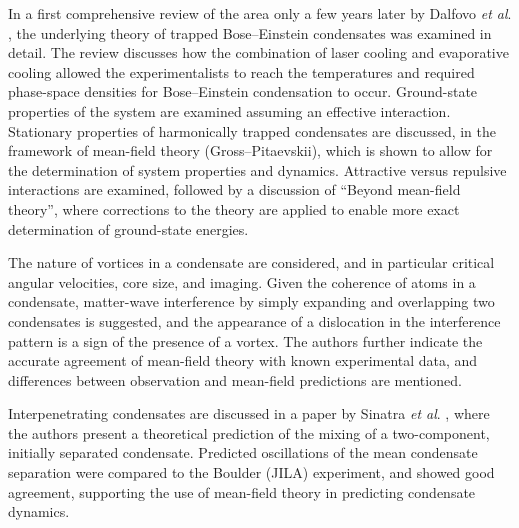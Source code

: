 In a first comprehensive review of the area only a few years later by Dalfovo \textit{et al}. \cite{BEC:Dalfovo_revmod_1999}, the underlying theory of trapped Bose--Einstein condensates was examined in detail. The review discusses how the combination of laser cooling and evaporative cooling \cite{AO:Ketterle_amop_1996} allowed the experimentalists to reach the temperatures and required phase-space densities for Bose--Einstein condensation to occur. Ground-state properties of the system are examined assuming an effective interaction. Stationary properties of harmonically trapped condensates are discussed, in the framework of mean-field theory (Gross--Pitaevskii), which is shown to allow for the determination of system properties and dynamics. Attractive versus repulsive interactions are examined, followed by a discussion of ``Beyond mean-field theory'', where corrections to the theory are applied to enable more exact determination of ground-state energies.

The nature of vortices in a condensate are considered, and in particular critical angular velocities, core size, and imaging. Given the coherence of atoms in a condensate, matter-wave interference by simply expanding and overlapping two condensates is suggested, and the appearance of a dislocation in the interference pattern is a sign of the presence of a vortex. The authors further indicate the accurate agreement of mean-field theory with known experimental data, and differences between observation and mean-field predictions are mentioned. %

Interpenetrating condensates are discussed in a paper by Sinatra \textit{et al}. \cite{BEC:Sinatra_prl_1999}, where the authors present a theoretical prediction of the mixing of a two-component, initially separated condensate. Predicted oscillations of the mean condensate separation were compared to the Boulder (JILA) experiment, and showed good agreement, supporting the use of mean-field theory in predicting condensate dynamics.

